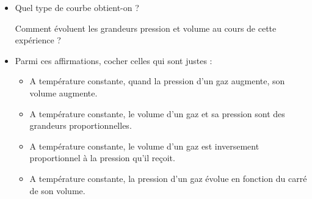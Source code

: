 \documentclass[11pt,a4paper]{article}
\begin{document}
	\begin{itemize}
	\item 
	
	
	Quel type de courbe obtient-on ? \\[3mm]
	
	\dotfill 
	
	Comment évoluent les grandeurs pression et volume au cours de cette expérience ? \\[3mm]
	
	\dotfill 
	
	\vspace{3mm}
	
	\dotfill 
	
	
	
	\item Parmi ces affirmations, cocher celles qui sont justes : \\[3mm]
	
	\begin{itemize}[label=$\square$]
		
		
		\item A température constante, quand la pression d'un gaz augmente, son volume augmente. 
		
		\item A température constante, le volume d'un gaz et sa pression sont des grandeurs       proportionnelles. 
		
		\item A température constante, le volume d’un gaz est inversement proportionnel à la pression        qu’il reçoit. 
		
		\item A température constante, la pression d'un gaz évolue en fonction du carré de son volume. 
		
	\end{itemize}
	\end{itemize}
	
	\dotfill
	
\end{document}
